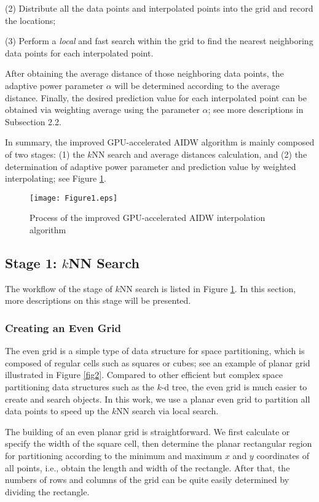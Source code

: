 \documentclass[final,5p,times,twocolumn,authoryear]{elsarticle}
\begin{document}
			(2) Distribute all the data points and interpolated points into the grid and 
			record the locations;
			
			(3) Perform a \textit{local} and fast search within the grid to find the nearest 
			neighboring data points for each interpolated point.
			
			After obtaining the average distance of those neighboring data points, the 
			adaptive power parameter $\alpha $ will be determined according to the 
			average distance. Finally, the desired prediction value for each 
			interpolated point can be obtained via weighting average using the parameter 
			$\alpha $; see more descriptions in Subsection 2.2.
			
			In summary, the improved GPU-accelerated AIDW algorithm is mainly composed of
			two stages: (1) the $k$NN search and average distances calculation, and (2) the 
			determination of adaptive power parameter and prediction value by weighted 
			interpolating; see Figure \ref{fig1}.
			
			\begin{figure}[ht]
				\centering
				\texttt{[image: Figure1.eps]}
				\caption{Process of the improved GPU-accelerated AIDW interpolation algorithm}
				\label{fig1}
			\end{figure}
			
			\subsection{Stage 1: $k$NN Search}
			The workflow of the stage of $k$NN search is listed in Figure \ref{fig1}. In this 
			section, more descriptions on this stage will be presented.
			
			\subsubsection{Creating an Even Grid}
			
			The even grid is a simple type of data structure for space partitioning, 
			which is composed of regular cells such as squares or cubes; see an example of 
			planar grid illustrated in Figure \ref{fig2}. Compared to other efficient but complex 
			space partitioning data structures such as the $k$-d tree, the even grid is 
			much easier to create and search objects. In this work, we use a planar even 
			grid to partition all data points to speed up the $k$NN search via local 
			search.
			
			The building of an even planar grid is straightforward. We first calculate 
			or specify the width of the square cell, then determine the planar 
			rectangular region for partitioning according to the minimum and maximum $x$ 
			and $y$ coordinates of all points, i.e., obtain the length and width of the 
			rectangle. After that, the numbers of rows and columns of the grid can be 
			quite easily determined by dividing the rectangle.
			
\end{document}
